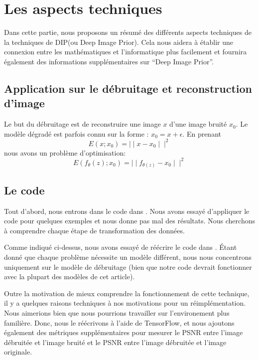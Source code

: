 \documentclass[
  11pt,
  dvipsnames]{article}
\begin{document}
\newpage

\hypertarget{les-aspects-techniques}{%
\section{Les aspects techniques}\label{les-aspects-techniques}}

Dans cette partie, nous proposons un résumé des différents aspects techniques de la techniques de DIP(ou Deep Image Prior).
Cela nous aidera à établir une connexion entre les mathématiques et l'informatique plus facilement
et fournira également des informations supplémentaires sur ``Deep Image Prior''.

\hypertarget{application-sur-le-duxe9bruitage-et-reconstruction-dimage}{%
\subsection{Application sur le débruitage et reconstruction d'image}\label{application-sur-le-duxe9bruitage-et-reconstruction-dimage}}

Le but du débruitage est de reconstruire une image \(x\) d'une image bruité \(x_0\). Le modèle dégradé est parfois connu sur la forme : \(x_0 = x + \epsilon\). En prenant \[ E(x;x_{0})= \mid\mid x - x_{0} \mid\mid^2 \] nous avons un problème d'optimisation: \[ E(f_{\theta}(z);x_{0})= \mid\mid f_{\theta(z)} - x_{0} \mid\mid^2 \]

\hypertarget{le-code}{%
\subsection{Le code}\label{le-code}}

Tout d'abord, nous entrons dans le code dans \autocite{1711.10925}. Nous avons essayé d'appliquer le code pour quelques exemples et nous donne pas mal des résultats. Nous cherchons à comprendre chaque étape de transformation des données.

Comme indiqué ci-dessus, nous avons essayé de réécrire le code dans \autocite{1711.10925}. Étant donné que chaque problème nécessite un modèle différent, nous nous concentrons uniquement sur le modèle de débruitage
(bien que notre code devrait fonctionner avec la plupart des modèles de cet article).

Outre la motivation de mieux comprendre la fonctionnement de cette technique, il y a quelques raisons techniques à nos motivations pour un réimplémentation. Nous aimerions bien que nous pourrions travailler sur l'environement plus familière. Donc, nous le réécrivons à l'aide de TensorFlow, et nous ajoutons également
des métriques supplémentaires pour mesurer le PSNR entre l'image
débruitée et l'image bruité et le PSNR entre l'image débruitée et l'image originale.
\end{document}
